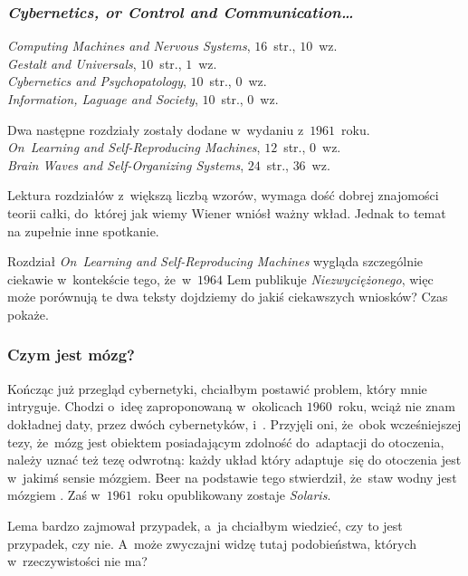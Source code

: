 \documentclass[10pt,t]{beamer}
\begin{document}
\begin{frame}
  \frametitle{\textit{Cybernetics, or Control and
      Communication\ldots}}


  \textit{Computing Machines and Nervous Systems}, $16$~str., $10$~wz. \\
  \textit{Gestalt and Universals}, $10$~str., $1$~wz. \\
  \textit{Cybernetics and Psychopatology}, $10$~str., $0$~wz. \\
  \textit{Information, Laguage and Society}, $10$~str., $0$~wz.

  Dwa następne rozdziały zostały dodane w~wydaniu z~$1961$~roku. \\
  \textit{On~Learning and Self-Reproducing Machines}, $12$~str., $0$~wz. \\
  \textit{Brain Waves and Self-Organizing Systems}, $24$~str., $36$~wz.

  Lektura rozdziałów z~większą liczbą wzorów, wymaga dość dobrej znajomości
  teorii całki, do~której jak wiemy Wiener wniósł ważny wkład. Jednak to
  temat na zupełnie inne spotkanie.

  Rozdział \textit{On~Learning and Self-Reproducing Machines} wygląda
  szczególnie ciekawie w~kontekście tego, że~w~$1964$ Lem publikuje
  \textit{Niezwyciężonego}, więc może porównują te dwa teksty dojdziemy
  do jakiś ciekawszych wniosków? Czas pokaże.

\end{frame}





\begin{frame}
  \frametitle{Czym jest mózg?}


  Kończąc już przegląd cybernetyki, chciałbym postawić problem, który mnie
  intryguje. Chodzi o~ideę zaproponowaną w~okolicach $1960$~roku, wciąż nie
  znam dokładnej daty, przez dwóch cybernetyków,
  i~.
  Przyjęli oni, że~obok wcześniejszej tezy, że~mózg jest obiektem
  posiadającym zdolność do~adaptacji do otoczenia, należy uznać też tezę
  odwrotną: każdy układ który adaptuje~się do otoczenia jest w~jakimś
  sensie mózgiem. Beer na podstawie tego stwierdził, że~staw wodny jest
  mózgiem \parencite{Pickering-Cybernetics-in-Britain-Ver-2022}. Zaś
  w~$1961$~roku opublikowany zostaje \textit{Solaris}.

  Lema bardzo zajmował przypadek, a~ja chciałbym wiedzieć, czy to jest
  przypadek, czy nie. A~może zwyczajni widzę tutaj podobieństwa, których
  w~rzeczywistości nie ma?

\end{frame}
\end{document}
